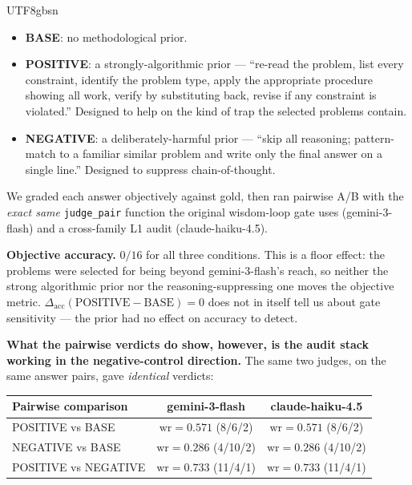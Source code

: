 \documentclass{article}
\begin{document}
\begin{CJK*}{UTF8}{gbsn}
\begin{itemize}[leftmargin=*,topsep=2pt]
  \item \textbf{BASE}: no methodological prior.
  \item \textbf{POSITIVE}: a strongly-algorithmic prior --- ``re-read
    the problem, list every constraint, identify the problem type,
    apply the appropriate procedure showing all work, verify by
    substituting back, revise if any constraint is violated.''
    Designed to help on the kind of trap the
    selected problems contain.
  \item \textbf{NEGATIVE}: a deliberately-harmful prior --- ``skip
    all reasoning; pattern-match to a familiar similar problem and
    write only the final answer on a single line.'' Designed to
    suppress chain-of-thought.
\end{itemize}

We graded each answer objectively against gold, then ran pairwise
A/B with the \emph{exact same} \texttt{judge\_pair} function the
original wisdom-loop gate uses (gemini-3-flash) and a cross-family
L1 audit (claude-haiku-4.5).

\textbf{Objective accuracy.} \(0/16\) for all three conditions.
This is a floor effect: the problems were selected for being beyond
gemini-3-flash's reach, so neither the strong algorithmic prior
nor the reasoning-suppressing one moves the objective metric.
\(\Delta_{\mathrm{acc}}(\text{POSITIVE} - \text{BASE}) = 0\) does
not in itself tell us about gate sensitivity --- the prior had no
effect on accuracy to detect.

\textbf{What the pairwise verdicts do show, however, is the
audit stack working in the negative-control direction.} The same
two judges, on the same answer pairs, gave \emph{identical}
verdicts:

\begin{center}\small
\begin{tabular}{lcc}
\toprule
Pairwise comparison & gemini-3-flash & claude-haiku-4.5 \\
\midrule
POSITIVE vs BASE  & \(\mathrm{wr}=0.571\) (8/6/2)  & \(\mathrm{wr}=0.571\) (8/6/2) \\
NEGATIVE vs BASE  & \(\mathrm{wr}=0.286\) (4/10/2) & \(\mathrm{wr}=0.286\) (4/10/2) \\
POSITIVE vs NEGATIVE & \(\mathrm{wr}=0.733\) (11/4/1) & \(\mathrm{wr}=0.733\) (11/4/1) \\
\bottomrule
\end{tabular}
\end{center}


\end{CJK*}
\end{document}
